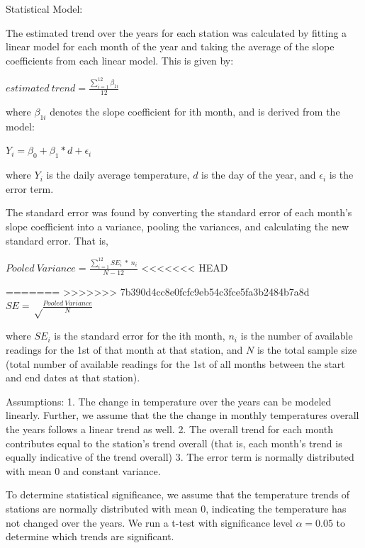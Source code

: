 \documentclass[
]{article}
\begin{document}
Statistical Model:

The estimated trend over the years for each station was calculated by
fitting a linear model for each month of the year and taking the average
of the slope coefficients from each linear model. This is given by:

\(estimated\ trend = \frac { \sum_{i = 1}^{12} \beta_{1i} }{12}\)

where \(\beta_{1i}\) denotes the slope coefficient for ith month, and is
derived from the model:

\(Y_i = \beta_0 + \beta_1 *d + \epsilon_i\)

where \(Y_i\) is the daily average temperature, \(d\) is the day of the
year, and \(\epsilon_i\) is the error term.

The standard error was found by converting the standard error of each
month's slope coefficient into a variance, pooling the variances, and
calculating the new standard error. That is,

\(Pooled\ Variance = \frac {\sum_{i=1}^{12}SE_i\ *\  n_i}{N - 12}\)
\textless\textless\textless\textless\textless\textless\textless{} HEAD

=======
\textgreater\textgreater\textgreater\textgreater\textgreater\textgreater\textgreater{}
7b390d4cc8e0fcfc9eb54c3fce5fa3b2484b7a8d
\(SE = \sqrt\frac {Pooled\ Variance}{N}\)

where \(SE_i\) is the standard error for the ith month, \(n_i\) is the
number of available readings for the 1st of that month at that station,
and \(N\) is the total sample size (total number of available readings
for the 1st of all months between the start and end dates at that
station).

Assumptions: 1. The change in temperature over the years can be modeled
linearly. Further, we assume that the the change in monthly temperatures
overall the years follows a linear trend as well. 2. The overall trend
for each month contributes equal to the station's trend overall (that
is, each month's trend is equally indicative of the trend overall) 3.
The error term is normally distributed with mean 0 and constant
variance.

To determine statistical significance, we assume that the temperature
trends of stations are normally distributed with mean 0, indicating the
temperature has not changed over the years. We run a t-test with
significance level \(\alpha = 0.05\) to determine which trends are
significant.
\end{document}
